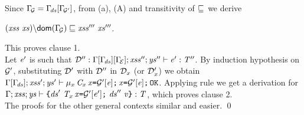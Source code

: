 Since $\Gamma_{\!{\cal{G}}}=\Gamma_{\!\mathit{ds}}[\Gamma_{\!{\cal{G'}}}]$, from (a), (A) and transitivity of $\sqsubseteq_{}$ we derive 
\begin{center}
$\LessEq{(\LentLocked\ \xs){\setminus}\dom{\TypeEnv{\genCtx}}}{\LentLocked'''\ \xs'''}$.
\end{center}
This proves clause 1.\\
Let $\mathit{e}'$ is such that 
${\cal D}'':\Gamma[\Gamma_{\!\mathit{ds}}][\Gamma_{\!{\cal{E}}}];\mathit{xss}'';\mathit{ys}''\vdash {\mathit{e}'}:\mathit{T}''$. By induction hypothesis on ${\cal{G'}}$, substituting ${\cal D}'$ with ${\cal D}''$ in ${\cal D}_x$ (or ${\cal D}'_x$) we obtain $\Gamma[\Gamma_{\!\mathit{ds}}];\mathit{xss}';\mathit{ys}'\vdash \mu_x\,\mathit{C}_x\,\mathit{x}\texttt{=}{\cal{G'}}[\mathit{e}]\texttt{;}\,\mathit{x}\texttt{=}{\cal{G'}}[\mathit{e}]\texttt{;}\,{\tt OK}$. Applying rule  we get  a derivation for
$\TypeCheck{\Gamma}{\LentLocked}{\StronglyLocked}{\Block{\decs'\ \Dec{\T_x}{\x}{\GenCtxP{\e'}}\ \decs''}{\val}}{\T}$,
which proves clause 2.\\
The proofs for the other general contexts similar and easier.
 \qed

